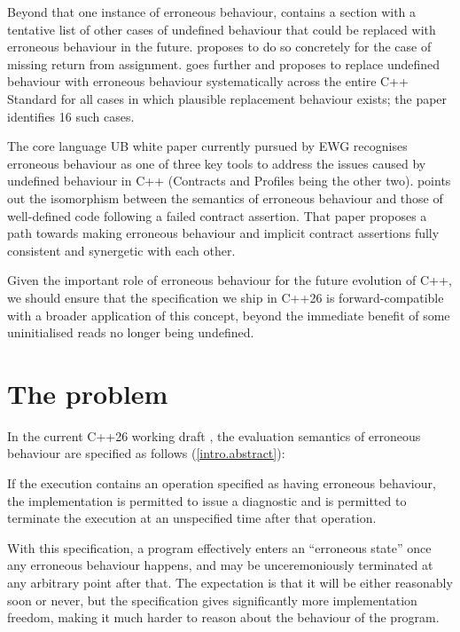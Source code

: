 Beyond that one instance of erroneous behaviour, \cite{P2795R5} contains a section with a tentative list of other cases of undefined behaviour that could be replaced with erroneous behaviour in the future. \cite{P2973R0} proposes to do so concretely for the case of missing return from assignment. \cite{P3100R4} goes further and proposes to replace undefined behaviour with erroneous behaviour systematically across the entire C++ Standard for all cases in which plausible replacement behaviour exists; the paper identifies 16 such cases.

The core language UB white paper \cite{P3656R1} currently pursued by EWG recognises erroneous behaviour as one of three key tools to address the issues caused by undefined behaviour in C++ (Contracts and Profiles being the other two). \cite{P3229R0} points out the isomorphism between the semantics of erroneous behaviour and those of well-defined code following a failed contract assertion. That paper proposes a path towards making erroneous behaviour and implicit contract assertions fully consistent and synergetic with each other.

Given the important role of erroneous behaviour for the future evolution of C++, we should ensure that the specification we ship in C++26 is forward-compatible with a broader application of this concept, beyond the immediate benefit of some uninitialised reads no longer being undefined.

\section{The problem}

In the current C++26 working draft \cite{N5014}, the evaluation semantics of erroneous behaviour are specified as follows (\href{https://eel.is/c++draft/intro.abstract#6.sentence-5}{[intro.abstract]}):
\begin{adjustwidth}{0.5cm}{0.5cm}
If the execution contains an operation specified as having erroneous behaviour, the implementation is permitted to issue a diagnostic and is permitted to terminate the execution at an unspecified time after that operation.
\end{adjustwidth} 
With this specification, a program effectively enters an ``erroneous state'' once any erroneous behaviour happens, and may be unceremoniously terminated at any arbitrary point after that.  The expectation is that it will be either reasonably soon or never, but the specification gives significantly more implementation freedom, making it much harder to reason about the behaviour of the program.

